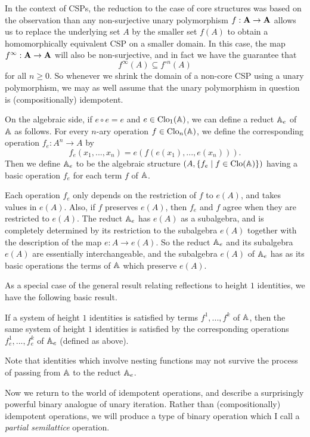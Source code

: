 \documentclass[letterpaper,11pt]{article}
\DeclareMathOperator{\Clo}{Clo}
\begin{document}
In the context of CSPs, the reduction to the case of core structures was based on the observation than any non-surjective unary polymorphism $f : \mathbf{A} \rightarrow \mathbf{A}$ allows us to replace the underlying set $A$ by the smaller set $f(A)$ to obtain a homomorphically equivalent CSP on a smaller domain. In this case, the map $f^\infty : \mathbf{A} \rightarrow \mathbf{A}$ will also be non-surjective, and in fact we have the guarantee that
\[
f^\infty(A) \subseteq f^{\circ n}(A)
\]
for all $n \ge 0$. So whenever we shrink the domain of a non-core CSP using a unary polymorphism, we may as well assume that the unary polymorphism in question is (compositionally) idempotent.

On the algebraic side, if $e \circ e = e$ and $e \in \Clo_1(\bA)$, we can define a reduct $\mathbb{A}_e$ of $\mathbb{A}$ as follows. For every $n$-ary operation $f \in \Clo_n(\bA)$, we define the corresponding operation $f_e : A^n \rightarrow A$ by
\[
f_e(x_1, ..., x_n) = e(f(e(x_1), ..., e(x_n))).
\]
Then we define $\mathbb{A}_e$ to be the algebraic structure $(A, \{f_e \mid f \in \Clo(\bA)\})$ having a basic operation $f_e$ for each term $f$ of $\mathbb{A}$.

Each operation $f_e$ only depends on the restriction of $f$ to $e(A)$, and takes values in $e(A)$. Also, if $f$ preserves $e(A)$, then $f_e$ and $f$ agree when they are restricted to $e(A)$. The reduct $\mathbb{A}_e$ has $e(A)$ as a subalgebra, and is completely determined by its restriction to the subalgebra $e(A)$ together with the description of the map $e : A \rightarrow e(A)$. So the reduct $\mathbb{A}_e$ and its subalgebra $e(A)$ are essentially interchangeable, and the subalgebra $e(A)$ of $\mathbb{A}_e$ has as its basic operations the terms of $\mathbb{A}$ which preserve $e(A)$.

As a special case of the general result relating reflections to height $1$ identities, we have the following basic result.

\begin{prop} If a system of height $1$ identities is satisfied by terms $f^1, ..., f^k$ of $\mathbb{A}$, then the same system of height $1$ identities is satisfied by the corresponding operations $f^1_e, ..., f^k_e$ of $\mathbb{A}_e$ (defined as above).
\end{prop}

Note that identities which involve nesting functions may not survive the process of passing from $\mathbb{A}$ to the reduct $\mathbb{A}_e$.

Now we return to the world of idempotent operations, and describe a surprisingly powerful binary analogue of unary iteration. Rather than (compositionally) idempotent operations, we will produce a type of binary operation which I call a \emph{partial semilattice} operation.
\end{document}
